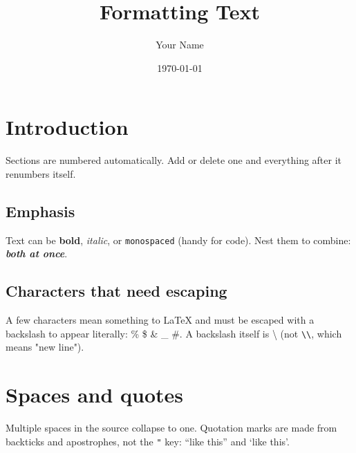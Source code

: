 \documentclass[12pt]{article}
\title{Formatting Text}
\author{Your Name}
\date{\today}
\begin{document}
\maketitle

\section{Introduction}

Sections are numbered automatically. Add or delete one and everything
after it renumbers itself.

\subsection{Emphasis}

Text can be \textbf{bold}, \textit{italic}, or \texttt{monospaced}
(handy for code). Nest them to combine: \textbf{\textit{both at once}}.

\subsection{Characters that need escaping}

A few characters mean something to LaTeX and must be escaped with a
backslash to appear literally: \% \$ \& \_ \#. A backslash itself is
\textbackslash{} (not \verb|\\|, which means "new line").

\section{Spaces and quotes}

Multiple     spaces in the source collapse to one. Quotation marks are
made from backticks and apostrophes, not the \texttt{"} key:
``like this'' and `like this'.
\end{document}
